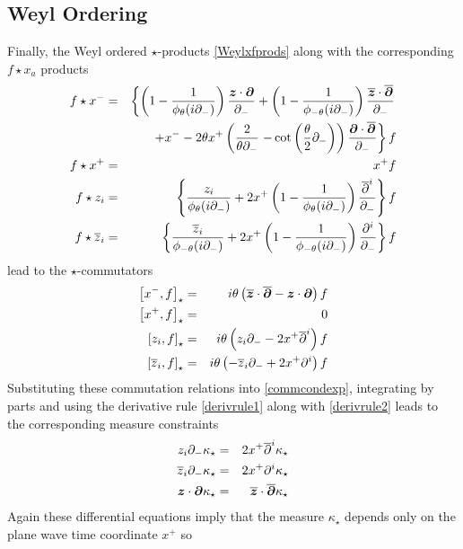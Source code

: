 \subsection{Weyl Ordering}
\label{Weylint}
Finally, the Weyl ordered $\star$-products \eqref{Weylxfprods} along with the
corresponding $f\star x_a$ products
\begin{eqnarray}
  \label{eq:weyl:starx}
  f\star x^-&=&\left\{
    \left(1-\frac{1}{\phi_\theta(i\partial_-)}\right)
        \frac{{{\boldsymbol {z} }} \cdot {{\boldsymbol {\partial} }}}{\partial_-}
    +\left(1-\frac{1}{\phi_{-\theta}(i\partial_-)}\right)
        \frac{\overline{{\boldsymbol {z} }} \cdot \overline{{\boldsymbol {\partial} }}}{\partial_-}\right.\\ \nonumber
    &&+x^--2\theta x^+\left(\frac{2}{\theta\partial_-}
        \left.-\cot\left(\frac\theta2\partial_-\right)\right)
        \frac{{{\boldsymbol {\partial} }}\cdot\overline{{\boldsymbol {\partial} }}}{\partial_-}\right\}f\\ \nonumber
  f\star x^+&=&x^+f\\ \nonumber
  f\star z_i&=&\left\{\frac{z_i}{\phi_\theta(i\partial_-)}
    +2x^+\left(1-\frac 1{\phi_\theta(i\partial_-)}\right)
      \frac{\overline{\partial}^i}{\partial_-}\right\}f\\ \nonumber
  f\star \overline{z}_i&=&\left\{\frac{\overline{z}_i}{\phi_{-\theta}(i\partial_-)}
    +2x^+\left(1-\frac 1{\phi_{-\theta}(i\partial_-)}\right)
      \frac{\partial^i}{\partial_-}\right\}f
\end{eqnarray}
lead to the $\star$-commutators
\begin{eqnarray}
  \label{eq:weyl:comm}
  \left[x^-,f\right]_\star&=&i \theta \left( \overline{{\boldsymbol {z} }}\cdot\overline{{\boldsymbol {\partial} }}
    -{{\boldsymbol {z} }}\cdot{{\boldsymbol {\partial} }}\right)f   \\ \nonumber
  \left[x^+,f\right]_\star&=&0   \\ \nonumber
  \left[z_i,f\right]_\star&=&i \theta \left(z_i \partial_-
    -2x^+ \overline{\partial}^{ i}\right)f   \\
  \left[ \overline{z}_i,f\right]_\star&=&i \theta \left(-\overline{z}_i \partial_-
    +2x^+ \partial^i\right)f \nonumber
\end{eqnarray}
Substituting these commutation relations into \eqref{commcondexp}, integrating
by parts and using the derivative rule \eqref{derivrule1} along with
\eqref{derivrule2} leads to the corresponding measure constraints
\begin{eqnarray}
  \label{eq:weyl:mu:all}
  z_i \partial_-\kappa_\star&=&2x^+ \overline{\partial}^{ i}\kappa_\star   \\ \nonumber
  \overline{z}_i \partial_-\kappa_\star&=&2x^+ \partial^i\kappa_\star   \\
  {{\boldsymbol {z} }}\cdot{{\boldsymbol {\partial} }}\kappa_\star&=&\overline{{\boldsymbol {z} }}\cdot\overline{{\boldsymbol {\partial} }}\kappa_\star \nonumber
\end{eqnarray}
Again these differential equations imply that the measure
$\kappa_\star$ depends only on the plane wave time coordinate $x^+$ so
